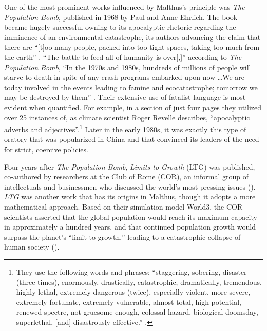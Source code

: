 \documentclass[12pt, a4paper, twoside]{article}
\begin{document}
One of the most prominent works influenced by Malthus’s principle was \emph{The Population Bomb}, published in 1968 by Paul and Anne Ehrlich. The book became hugely successful owning to its apocalyptic rhetoric regarding the imminence of an environmental catastrophe, its authors advancing the claim that there are “[t]oo many people, packed into too-tight spaces, taking too much from the earth” \autocite{Mann2018Smithsonian}. “The battle to feed all of humanity is over[,]” according to \emph{The Population Bomb}, “In the 1970s and 1980s, hundreds of millions of people will starve to death in spite of any crash programs embarked upon now …We are today involved in the events leading to famine and ecocatastrophe; tomorrow we may be destroyed by them” \autocite[p.\ xi]{Ehrlich1971PopulationBomb}. Their extensive use of fatalist language is most evident when quantified. For example, in a section of just four pages they utilized over 25 instances of, as climate scientist Roger Revelle describes, “apocalyptic adverbs and adjectives''.\footnote{They use the following words and phrases: ``staggering, sobering, disaster (three times), enormously, drastically, catastrophic, dramatically, tremendous, highly lethal, extremely dangerous (twice), especially violent, more severe, extremely fortunate, extremely vulnerable, almost total, high potential, renewed spectre, not gruesome enough, colossal hazard, biological doomsday, superlethal, [and] disastrously effective.'' \cite[pp.\ 66-70]{Revelle1971}.} Later in the early 1980s, it was exactly this type of oratory that was popularized in China and that convinced its leaders of the need for strict, coercive policies.

Four years after \emph{The Population Bomb}, \emph{Limits to Growth} (LTG) was published, co-authored by researchers at the Club of Rome (COR), an informal group of intellectuals and businessmen who discussed the world’s most pressing issues (\cites{Masini2001}{ClubOfRomeAbout}). \emph{LTG} was another work that has its origins in Malthus, though it adopts a more mathematical approach. Based on their simulation model World3, the COR scientists asserted that the global population would reach its maximum capacity in approximately a hundred years, and that continued population growth would surpass the planet’s “limit to growth,” leading to a catastrophic collapse of human society (\cites[p.\ 23]{MeadowsEtAl1976}[p.\ 132]{Greenhalgh2008JustOneChild}).
\end{document}

